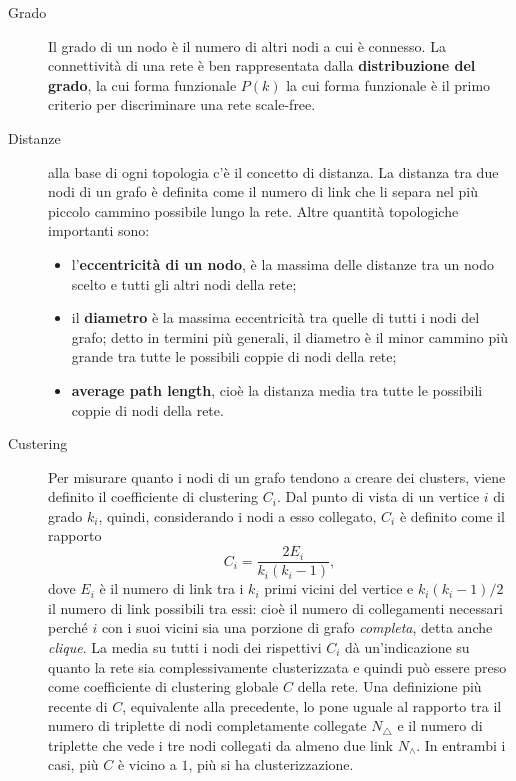\begin{description}
	\item[Grado] Il grado di un nodo è il numero di altri nodi a cui è connesso. La connettività di una rete è ben rappresentata dalla \textbf{distribuzione del grado}, la cui forma funzionale $P(k)$ la cui forma funzionale è il primo criterio per discriminare una rete scale-free. 
	
	\item[Distanze] alla base di ogni topologia c'è il concetto di distanza. La distanza tra due nodi di un grafo è definita come il numero di link che li separa nel più piccolo cammino possibile lungo la rete. Altre quantità topologiche importanti sono:
	\begin{itemize}
		\item l'\textbf{eccentricità di un nodo}, è la massima delle distanze tra un nodo scelto e tutti gli altri nodi della rete;
		\item il \textbf{diametro} è la massima eccentricità tra quelle di tutti i nodi del grafo; detto in termini più generali, il diametro è il minor cammino più grande tra tutte le possibili coppie di nodi della rete;
		\item \textbf{average path length}, cio\`e la distanza media tra tutte le possibili coppie di nodi della rete.
	\end{itemize} 
	
	\item[Custering] Per misurare quanto i nodi di un grafo tendono a creare dei clusters, viene definito il coefficiente di clustering $C_i$. Dal punto di vista di un vertice $i$ di grado $k_i$, quindi, considerando i nodi a esso collegato, $C_i$ è definito come il rapporto
	\[C_i = \frac{2E_i}{k_i(k_i-1)},\]
	dove $E_i$ è il numero di link tra i $k_i$ primi vicini del vertice e $k_i(k_i-1)/2$ il numero di link possibili tra essi: cioè il numero di collegamenti necessari perché $i$ con i suoi vicini sia una porzione di grafo \emph{completa}, detta anche \emph{clique}.  
	La media su tutti i nodi dei rispettivi $C_i$ dà un'indicazione su quanto la rete sia complessivamente clusterizzata e quindi può essere preso come coefficiente di clustering globale $C$ della rete. Una definizione più recente di $C$, equivalente alla precedente, lo pone uguale al rapporto tra il numero di triplette di nodi completamente collegate $N_\triangle$ e il numero di triplette che vede i tre nodi collegati da almeno due link $N_\wedge$. In entrambi i casi, più $C$ è vicino a $1$, più si ha clusterizzazione.
	

\end{description}
